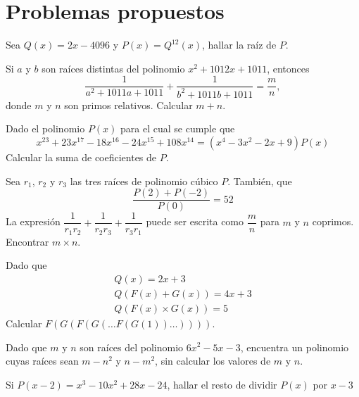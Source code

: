\section{Problemas propuestos}

\begin{section-problem}
    Sea $Q(x) = 2x - 4096$ y $P(x) = Q^{12}(x)$, hallar la raíz de $P$.
\end{section-problem}

\begin{section-problem}
    Si $a$ y $b$ son raíces distintas del polinomio $x^2 + 1012x + 1011$, entonces
    \[\frac{1}{a^2 + 1011a + 1011} + \frac{1}{b^2 + 1011b + 1011} = \frac{m}{n},\]
    donde $m$ y $n$ son primos relativos.
    Calcular $m + n$.
\end{section-problem}

\begin{section-problem}
    Dado el polinomio $P(x)$ para el cual se cumple que
    \[x^{23} + 23x^{17} - 18x^{16} - 24x^{15} + 108x^{14} = (x^4 - 3x^2 - 2x + 9)P(x)\]
    Calcular la suma de coeficientes de $P$.
\end{section-problem}

\begin{section-problem}
    Sea $r_1$, $r_2$ y $r_3$ las tres raíces de polinomio cúbico $P$.
    También, que
    \[\frac{P(2) + P(-2)}{P(0)} = 52\]
    La expresión $\dfrac{1}{r_1 r_2} + \dfrac{1}{r_2 r_3} + \dfrac{1}{r_3 r_1}$ puede ser escrita como $\dfrac{m}{n}$ para $m$ y $n$ coprimos.
    Encontrar $m\times n$.
\end{section-problem}

\begin{section-problem}
    Dado que
    \begin{gather*}
        Q(x) = 2x + 3 \\
        Q( F(x) + G(x) ) = 4x + 3 \\
        Q( F(x) \times G(x) ) = 5
    \end{gather*}
    Calcular $F(G(F(G(\dots F(G(1))\dots))))$.
\end{section-problem}

\begin{section-problem}
    Dado que $m$ y $n$ son raíces del polinomio $6x^2 - 5x - 3$, encuentra un polinomio cuyas raíces sean
    $m - n^2$ y $n - m^2$, sin calcular los valores de $m$ y $n$.
\end{section-problem}

\begin{section-problem}
    Si $P(x - 2) = x^3 - 10x^2 + 28x - 24$, hallar el resto de dividir $P(x)$ por $x - 3$
\end{section-problem}

